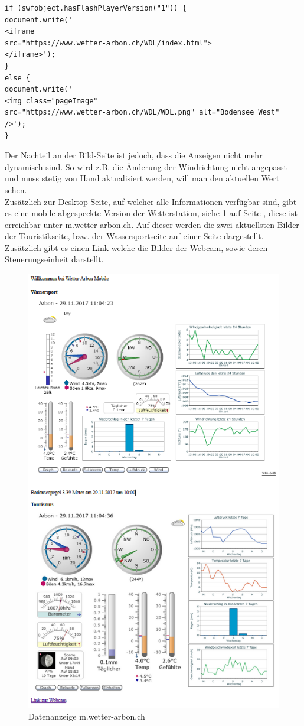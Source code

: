 \begin{lstlisting}
if (swfobject.hasFlashPlayerVersion("1")) {
document.write('
<iframe 
src="https://www.wetter-arbon.ch/WDL/index.html">
</iframe>');
} 
else {
document.write('
<img class="pageImage" 
src="https://www.wetter-arbon.ch/WDL/WDL.png" alt="Bodensee West" 
/>');
}
\end{lstlisting}

Der Nachteil an der Bild-Seite ist jedoch, dass die Anzeigen nicht mehr dynamisch sind. So wird z.B. die Änderung der Windrichtung nicht angepasst und muss stetig von Hand aktualisiert werden, will man den aktuellen Wert sehen.\\

Zusätzlich zur Desktop-Seite, auf welcher alle Informationen verfügbar sind, gibt es eine mobile abgespeckte Version der Wetterstation, siehe \ref{img:mobilewebseite} auf Seite \pageref{img:mobilewebseite}, diese ist erreichbar unter m.wetter-arbon.ch. Auf dieser werden die zwei aktuellsten Bilder der Touristikseite, bzw. der Wassersportseite auf einer Seite dargestellt. Zusätzlich gibt es einen Link welche die Bilder der Webcam, sowie deren Steuerungseinheit darstellt.
\begin{figure}[htbp]
	\centering
	\includegraphics[width=0.9\linewidth]{img/mobile_webseite}
	\caption{Datenanzeige m.wetter-arbon.ch}
	\label{img:mobilewebseite}
\end{figure}

